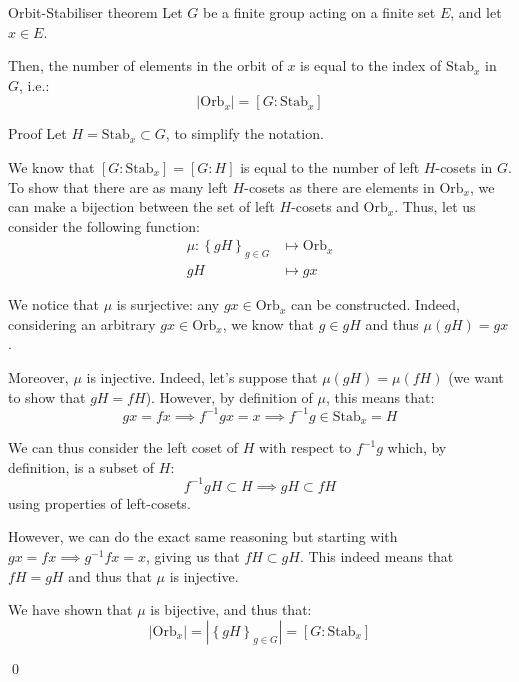 \documentclass[a4paper]{article}
\begin{document}
\begin{parag}{Orbit-Stabiliser theorem}
    Let $G$ be a finite group acting on a finite set $E$, and let $x \in E$.

    Then, the number of elements in the orbit of $x$ is equal to the index of $\text{Stab}_x$ in $G$, i.e.: 
    \[\left|\text{Orb}_x\right| = \left[G : \text{Stab}_x\right]\]

    \begin{subparag}{Proof}
        Let $H = \text{Stab}_x \subset G$, to simplify the notation.

        We know that $\left[G : \text{Stab}_x\right] = \left[G : H\right]$ is equal to the number of left $H$-cosets in $G$. To show that there are as many left $H$-cosets as there are elements in $\text{Orb}_x$, we can make a bijection between the set of left $H$-cosets and $\text{Orb}_x$. Thus, let us consider the following function:
        \[\begin{split}
        \mu: \left\{gH\right\}_{g \in G} &\longmapsto \text{Orb}_x \\
        gH &\longmapsto g x
        \end{split}\]
        
        We notice that $\mu$ is surjective: any $gx \in \text{Orb}_x$ can be constructed. Indeed, considering an arbitrary $gx \in \text{Orb}_x$, we know that $g \in gH$ and thus $\mu\left(gH\right) = gx$.

        Moreover, $\mu$ is injective. Indeed, let's suppose that $\mu\left(g H\right) = \mu\left(f H\right)$ (we want to show that $gH = fH$). However, by definition of $\mu$, this means that: 
        \[gx = fx \implies f^{-1} g x = x \implies f^{-1} g \in \text{Stab}_x = H\]
        
        We can thus consider the left coset of $H$ with respect to $f^{-1} g$ which, by definition, is a subset of $H$: 
        \[f^{-1} g H \subset H \implies gH \subset fH\]
        using properties of left-cosets.

        However, we can do the exact same reasoning but starting with $gx = fx \implies g^{-1} f x = x$, giving us that $fH \subset gH$. This indeed means that $fH = gH$ and thus that $\mu$ is injective.

        We have shown that $\mu$ is bijective, and thus that: 
        \[\left|\text{Orb}_x\right| = \left|\left\{gH\right\}_{g \in G}\right| = \left[G : \text{Stab}_x\right]\]

        \qed
    \end{subparag}
\end{parag}
\end{document}
